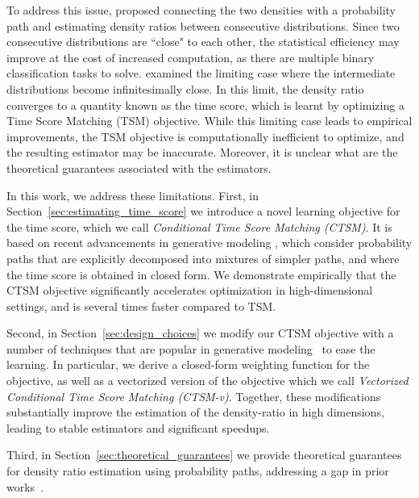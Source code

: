To address this issue, \citet{Rhodes2020} proposed connecting the two densities with a probability path and estimating density ratios between consecutive distributions. Since two consecutive distributions are ``close" to each other, the statistical efficiency may improve at the cost of increased computation, as there are multiple binary classification tasks to solve. \citet{choi2022densityratio} examined the limiting case where the intermediate distributions become infinitesimally close. In this limit, the density ratio converges to a quantity known as the time score, which is learnt by optimizing a Time Score Matching (TSM) objective. While this limiting case leads to empirical improvements, the TSM objective is computationally inefficient to optimize, and the resulting estimator may be inaccurate. Moreover, it is unclear what are the theoretical guarantees associated with the estimators.

In this work, we address these limitations. First, in Section~\ref{sec:estimating_time_score} we introduce a novel learning objective for the time score, which we call \textit{Conditional Time Score Matching (CTSM)}. It is based on recent advancements in generative modeling \citep{vincent2011denoisingscorematching,pooladian2023conditionalflowmatching,tong2024conditionalflowmatching}, which consider probability paths that are explicitly decomposed into mixtures of simpler paths, and where the time score is obtained in closed form. We demonstrate empirically that the CTSM objective significantly accelerates optimization in high-dimensional settings, and is several times faster 
compared to TSM. 

Second, in Section~\ref{sec:design_choices} we modify our CTSM objective with a number of techniques that are popular in generative modeling~\citep{song2021sde,choi2022densityratio,tong2024conditionalflowmatching} to ease the learning. In particular, we derive a closed-form weighting function for the objective, as well as a vectorized version of the objective which we call \textit{Vectorized Conditional Time Score Matching (CTSM-v)}. Together, these modifications substantially improve the estimation of the density-ratio in high dimensions, leading to stable estimators and significant speedups. 

Third, in Section~\ref{sec:theoretical_guarantees} we provide theoretical guarantees for density ratio estimation using probability paths, addressing a gap in prior works~\citep{Rhodes2020,choi2022densityratio}. 



